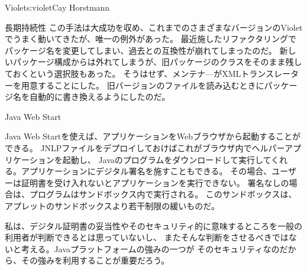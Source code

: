 \begin{aosachapter}{Violet}{s:violet}{Cay Horstmann}
\begin{aosasect1}{長期持続性}
この手法は大成功を収め、これまでのさまざまなバージョンのVioletでうまく動いてきたが、唯一の例外があった。
最近施したリファクタリングでパッケージ名を変更してしまい、過去との互換性が崩れてしまったのだ。
新しいパッケージ構成からは外れてしまうが、旧パッケージのクラスをそのまま残しておくという選択肢もあった。
そうはせず、メンテナ—がXMLトランスレーターを用意することにした。
旧バージョンのファイルを読み込むときにパッケージ名を自動的に書き換えるようにしたのだ。

\end{aosasect1}

\begin{aosasect1}{Java Web Start}

Java Web Startを使えば、アプリケーションをWebブラウザから起動することができる。
JNLPファイルをデプロイしておけばこれがブラウザ内でヘルパーアプリケーションを起動し、
Javaのプログラムをダウンロードして実行してくれる。アプリケーションにデジタル署名を施すこともできる。
その場合、ユーザーは証明書を受け入れないとアプリケーションを実行できない。
署名なしの場合は、プログラムはサンドボックス内で実行される。
このサンドボックスは、アプレットのサンドボックスより若干制限の緩いものだ。

私は、デジタル証明書の妥当性やそのセキュリティ的に意味するところを一般の利用者が判断できるとは思っていないし、
またそんな判断をさせるべきではないと考える。Javaプラットフォームの強みの一つが
そのセキュリティなのだから、その強みを利用することが重要だろう。


\end{aosasect1}
\end{aosachapter}
